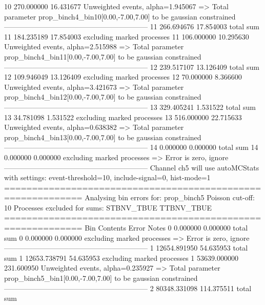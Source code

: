 10         270.000000      16.431677       Unweighted events, alpha=1.945067
  => Total parameter prop_binch4_bin10[0.00,-7.00,7.00] to be gaussian constrained
------------------------------------------------------------
11         266.694676      17.854003       total sum                     
11         184.235189      17.854003       excluding marked processes    
11         106.000000      10.295630       Unweighted events, alpha=2.515988
  => Total parameter prop_binch4_bin11[0.00,-7.00,7.00] to be gaussian constrained
------------------------------------------------------------
12         239.517107      13.126409       total sum                     
12         109.946049      13.126409       excluding marked processes    
12         70.000000       8.366600        Unweighted events, alpha=3.421673
  => Total parameter prop_binch4_bin12[0.00,-7.00,7.00] to be gaussian constrained
------------------------------------------------------------
13         329.405241      1.531522        total sum                     
13         34.781098       1.531522        excluding marked processes    
13         516.000000      22.715633       Unweighted events, alpha=0.638382
  => Total parameter prop_binch4_bin13[0.00,-7.00,7.00] to be gaussian constrained
------------------------------------------------------------
14         0.000000        0.000000        total sum                     
14         0.000000        0.000000        excluding marked processes    
  => Error is zero, ignore      
------------------------------------------------------------
Channel ch5 will use autoMCStats with settings: event-threshold=10, include-signal=0, hist-mode=1
============================================================
Analysing bin errors for: prop_binch5
Poisson cut-off: 10
Processes excluded for sums: STBNV_TBUE TTBNV_TBUE
============================================================
Bin        Contents        Error           Notes                         
0          0.000000        0.000000        total sum                     
0          0.000000        0.000000        excluding marked processes    
  => Error is zero, ignore      
------------------------------------------------------------
1          12654.891950    54.635953       total sum                     
1          12653.738791    54.635953       excluding marked processes    
1          53639.000000    231.600950      Unweighted events, alpha=0.235927
  => Total parameter prop_binch5_bin1[0.00,-7.00,7.00] to be gaussian constrained
------------------------------------------------------------
2          80348.331098    114.375511      total sum                     
